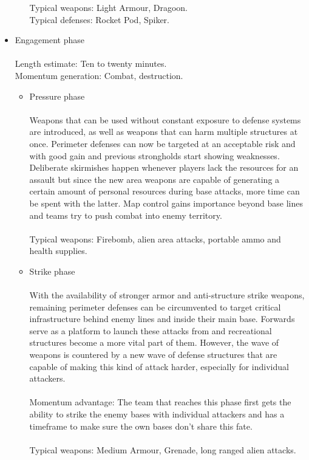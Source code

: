 \documentclass{scrartcl}
\begin{document}
\begin{itemize}
\begin{itemize}
			Typical weapons: Light Armour, Dragoon. \\
			Typical defenses: Rocket Pod, Spiker. \\
		\end{itemize}
	\item Engagement phase \\\\
		Length estimate: Ten to twenty minutes. \\
		Momentum generation: Combat, destruction. \\
		\begin{itemize}
		\item Pressure phase \\\\
			Weapons that can be used without constant exposure to defense systems are introduced, as well as weapons that can harm multiple structures at once. Perimeter defenses can now be targeted at an acceptable risk and with good gain and previous strongholds start showing weaknesses. Deliberate skirmishes happen whenever players lack the resources for an assault but since the new area weapons are capable of generating a certain amount of personal resources during base attacks, more time can be spent with the latter. Map control gains importance beyond base lines and teams try to push combat into enemy territory. \\\\
			Typical weapons: Firebomb, alien area attacks, portable ammo and health supplies. \\
		\item Strike phase \\\\
			With the availability of stronger armor and anti-structure strike weapons, remaining perimeter defenses can be circumvented to target critical infrastructure behind enemy lines and inside their main base. Forwards serve as a platform to launch these attacks from and recreational structures become a more vital part of them. However, the wave of weapons is countered by a new wave of defense structures that are capable of making this kind of attack harder, especially for individual attackers. \\\\
			Momentum advantage: The team that reaches this phase first gets the ability to strike the enemy bases with individual attackers and has a timeframe to make sure the own bases don't share this fate. \\\\
			Typical weapons: Medium Armour, Grenade, long ranged alien attacks. \\

\end{itemize}
\end{itemize}
\end{document}
